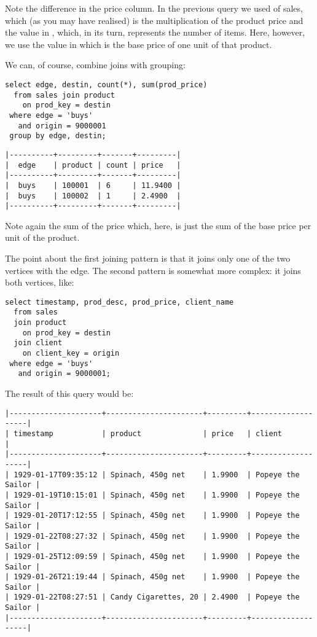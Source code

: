 Note the difference in the price column.
In the previous query we used  of sales,
which (as you may have realised)
is the multiplication of the product price and the value
in , which, in its turn,
represents the number of items.
Here, however, we use the value in 
which is the base price of one unit of that product.

We can, of course, combine joins with grouping:

\begin{sqlcode}
\begin{lstlisting}
select edge, destin, count(*), sum(prod_price)
  from sales join product
    on prod_key = destin
 where edge = 'buys'
   and origin = 9000001
 group by edge, destin;
\end{lstlisting}
\end{sqlcode}

\begin{verbatim}
|----------+---------+-------+---------|
|  edge    | product | count | price   |
|----------+---------+-------+---------|
|  buys    | 100001  | 6     | 11.9400 |
|  buys    | 100002  | 1     | 2.4900  |
|----------+---------+-------+---------|
\end{verbatim}

Note again the sum of the price which, here,
is just the sum of the base price per unit of the product.

The point about the first joining pattern
is that it joins only one of the two vertices
with the edge. The second pattern is somewhat more complex:
it joins both vertices, like:

\begin{sqlcode}
\begin{lstlisting}
select timestamp, prod_desc, prod_price, client_name
  from sales
  join product
    on prod_key = destin
  join client
    on client_key = origin
 where edge = 'buys'
   and origin = 9000001;
\end{lstlisting}
\end{sqlcode}

The result of this query would be:

\begin{verbatim}
|---------------------+----------------------+---------+-------------------|
| timestamp           | product              | price   | client            |
|---------------------+----------------------+---------+-------------------|
| 1929-01-17T09:35:12 | Spinach, 450g net    | 1.9900  | Popeye the Sailor |
| 1929-01-19T10:15:01 | Spinach, 450g net    | 1.9900  | Popeye the Sailor |
| 1929-01-20T17:12:55 | Spinach, 450g net    | 1.9900  | Popeye the Sailor |
| 1929-01-22T08:27:32 | Spinach, 450g net    | 1.9900  | Popeye the Sailor |
| 1929-01-25T12:09:59 | Spinach, 450g net    | 1.9900  | Popeye the Sailor |
| 1929-01-26T21:19:44 | Spinach, 450g net    | 1.9900  | Popeye the Sailor |
| 1929-01-22T08:27:51 | Candy Cigarettes, 20 | 2.4900  | Popeye the Sailor |
|---------------------+----------------------+---------+-------------------|
\end{verbatim}

